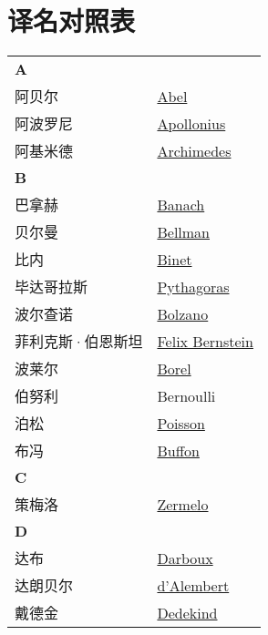 \chapter{译名对照表}
\def\InsertTable#1{\begin{longtable}{ll} #1 \end{longtable}}%
\InsertTable{
	\textbf{A} \\
	阿贝尔 & \href{https://mathshistory.st-andrews.ac.uk/Biographies/Abel/}{Abel} \\
	阿波罗尼 & \href{https://mathshistory.st-andrews.ac.uk/Biographies/Apollonius/}{Apollonius} \\
	阿基米德 & \href{https://mathshistory.st-andrews.ac.uk/Biographies/Archimedes/}{Archimedes} \\
	\textbf{B} \\
	巴拿赫 & \href{https://mathshistory.st-andrews.ac.uk/Biographies/Banach/}{Banach} \\
	贝尔曼 & \href{https://mathshistory.st-andrews.ac.uk/Biographies/Bellman/}{Bellman} \\
	比内 & \href{https://mathshistory.st-andrews.ac.uk/Biographies/Binet/}{Binet} \\
	毕达哥拉斯 & \href{https://mathshistory.st-andrews.ac.uk/Biographies/Pythagoras/}{Pythagoras} \\
	波尔查诺 & \href{https://mathshistory.st-andrews.ac.uk/Biographies/Bolzano/}{Bolzano} \\
	菲利克斯·伯恩斯坦 & \href{https://mathshistory.st-andrews.ac.uk/Biographies/Bernstein_Felix/}{Felix Bernstein} \\
	波莱尔 & \href{https://mathshistory.st-andrews.ac.uk/Biographies/Borel/}{Borel} \\
	伯努利 & Bernoulli \\
	泊松 & \href{https://mathshistory.st-andrews.ac.uk/Biographies/Poisson/}{Poisson} \\
	布冯 & \href{https://mathshistory.st-andrews.ac.uk/Biographies/Buffon/}{Buffon} \\
	\textbf{C} \\
	策梅洛 & \href{https://mathshistory.st-andrews.ac.uk/Biographies/Zermelo/}{Zermelo} \\
	\textbf{D} \\
	达布 & \href{https://mathshistory.st-andrews.ac.uk/Biographies/Darboux/}{Darboux} \\
	达朗贝尔 & \href{https://mathshistory.st-andrews.ac.uk/Biographies/DAlembert/}{d'Alembert} \\
	戴德金 & \href{https://mathshistory.st-andrews.ac.uk/Biographies/Dedekind/}{Dedekind} \\
}
